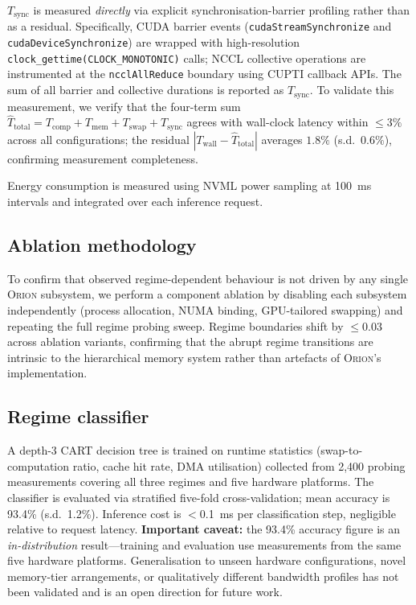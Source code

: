\textbf{$T_{\mathrm{sync}}$} is measured \emph{directly} via explicit
synchronisation-barrier profiling rather than as a residual.
Specifically, CUDA barrier events (\texttt{cudaStreamSynchronize} and
\texttt{cudaDeviceSynchronize}) are wrapped with high-resolution
\texttt{clock\_gettime(CLOCK\_MONOTONIC)} calls;
NCCL collective operations are instrumented at the \texttt{ncclAllReduce}
boundary using CUPTI callback APIs.
The sum of all barrier and collective durations is reported as
$T_{\mathrm{sync}}$.
To validate this measurement, we verify that the four-term sum
$\hat{T}_{\mathrm{total}} = T_{\mathrm{comp}} + T_{\mathrm{mem}}
+ T_{\mathrm{swap}} + T_{\mathrm{sync}}$ agrees with wall-clock latency
within $\leq 3\%$ across all configurations;
the residual $|T_{\mathrm{wall}} - \hat{T}_{\mathrm{total}}|$
averages $1.8\%$ (s.d.\ $0.6\%$), confirming measurement completeness.

Energy consumption is measured using NVML power sampling at 100~ms
intervals and integrated over each inference request.

\subsection*{Ablation methodology}

To confirm that observed regime-dependent behaviour is not driven by any single
\textsc{Orion} subsystem, we perform a component ablation by disabling each
subsystem independently (process allocation, NUMA binding, GPU-tailored
swapping) and repeating the full regime probing sweep.
Regime boundaries shift by $\leq 0.03$ across ablation variants, confirming
that the abrupt regime transitions are intrinsic to the hierarchical memory system
rather than artefacts of \textsc{Orion}'s implementation.

\subsection*{Regime classifier}

A depth-3 CART decision tree is trained on runtime statistics
(swap-to-computation ratio, cache hit rate, DMA utilisation) collected from
2,400 probing measurements covering all three regimes and five hardware
platforms.
The classifier is evaluated via stratified five-fold cross-validation; mean
accuracy is 93.4\% (s.d.\ 1.2\%).
Inference cost is $<$0.1~ms per classification step, negligible relative to
request latency.
\textbf{Important caveat:} the 93.4\% accuracy figure is an
\emph{in-distribution} result---training and evaluation use measurements from
the same five hardware platforms.
Generalisation to unseen hardware configurations, novel memory-tier
arrangements, or qualitatively different bandwidth profiles has not been
validated and is an open direction for future work.

